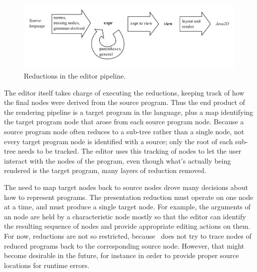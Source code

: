 \begin{figure}[t]
	\begin{center}
	\includegraphics[scale=0.8]{src/image/pipeline.pdf}	
	\end{center}

	\caption{Reductions in the editor pipeline.}
	\label{fig-pipeline} 
\end{figure}

The editor itself takes charge of executing the reductions, keeping track of how the final  nodes were derived from the source program. Thus the end product of the rendering pipeline is a target program in the  language, plus a map identifying the target program node that arose from each source program node. Because a source program node often reduces to a sub-tree rather than a single node, not every target program node is identified with a source; only the root of each sub-tree needs to be tracked. The editor uses this tracking of nodes to let the user interact with the nodes of the  program, even though what's actually being rendered is the target program, many layers of reduction removed.


The need to map target nodes back to source nodes drove many decisions about how to represent programs. The presentation reduction must operate on one node at a time, and must produce a single target node. For example, the arguments of an  node are held by a characteristic  node mostly so that the editor can identify the resulting sequence of nodes and provide appropriate editing actions on them. For now,  reductions are not so restricted, because \Meta\ does not try to trace nodes of reduced programs back to the corresponding source node. However, that might become desirable in the future, for instance in order to provide proper source locations for runtime errors.

